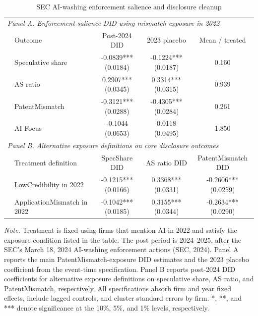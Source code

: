 \begin{table}[!htbp]
\centering
\caption{SEC AI-washing enforcement salience and disclosure cleanup}
\label{tab:sec_enforcement_did_v32}
\small
\begin{tabular}{llccc}
\hline
\multicolumn{5}{l}{\textit{Panel A. Enforcement-salience DID using mismatch exposure in 2022}} \\
 & Outcome & Post-2024 DID & 2023 placebo & Mean / treated \\
\hline
 & Speculative share & -0.0839*** (0.0184) & -0.1224*** (0.0187) & 0.160 \\
 & AS ratio & 0.2907*** (0.0345) & 0.3314*** (0.0315) & 0.939 \\
 & PatentMismatch & -0.3121*** (0.0288) & -0.4305*** (0.0284) & 0.261 \\
 & AI Focus & -0.1044 (0.0653) & 0.0118 (0.0495) & 1.850 \\
\hline
\multicolumn{5}{l}{\textit{Panel B. Alternative exposure definitions on core disclosure outcomes}} \\
 & Treatment definition & SpecShare DID & AS ratio DID & PatentMismatch DID \\
\hline
 & LowCredibility in 2022 & -0.1215*** (0.0166) & 0.3368*** (0.0331) & -0.2606*** (0.0259) \\
 & ApplicationMismatch in 2022 & -0.1042*** (0.0185) & 0.3155*** (0.0344) & -0.2634*** (0.0290) \\
\hline
\end{tabular}
\begin{flushleft}
\footnotesize \textit{Note.} Treatment is fixed using firms that mention AI in 2022 and satisfy the exposure condition listed in the table. The post period is 2024--2025, after the SEC's March 18, 2024 AI-washing enforcement actions (SEC, 2024). Panel A reports the main PatentMismatch-exposure DID estimates and the 2023 placebo coefficient from the event-time specification. Panel B reports post-2024 DID coefficients for alternative exposure definitions on speculative share, AS ratio, and PatentMismatch, respectively. All specifications absorb firm and year fixed effects, include lagged controls, and cluster standard errors by firm. *, **, and *** denote significance at the 10\%, 5\%, and 1\% levels, respectively.
\end{flushleft}
\end{table}
